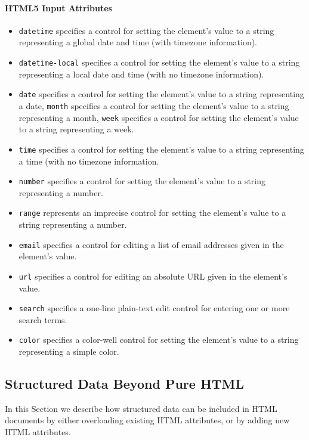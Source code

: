 \documentclass[12pt]{article}
\begin{document}
\paragraph{HTML5 Input Attributes}
\begin{itemize}
\item \texttt{datetime} specifies a control for setting the element's value to a string representing a global date and time (with timezone information).
\item \texttt{datetime-local} specifies a control for setting the element's value to a string representing a local date and time (with no timezone information).
\item \texttt{date} specifies a control for setting the element's value to a string representing a date, \texttt{month} specifies a control for setting the element's value to a string representing a month, \texttt{week} specifies a control for setting the element's value to a string representing a week.
\item \texttt{time} specifies a control for setting the element's value to a string representing a time (with no timezone information.
\item \texttt{number} specifies a control for setting the element's value to a string representing a number.
\item \texttt{range}  represents an imprecise control for setting the element's value to a string representing a number.
\item \texttt{email} specifies a control for editing a list of email addresses given in the element's value.
\item \texttt{url} specifies a control for editing an absolute URL given in the element's value.
\item \texttt{search} specifies a one-line plain-text edit control for entering one or more search terms.
\item \texttt{color} specifies a color-well control for setting the element's value to a string representing a simple color.
\end{itemize}

\subsection{Structured Data Beyond Pure HTML}
In this Section we describe how structured data can be included in HTML documents by either overloading existing HTML attributes, or by adding new HTML attributes.
\end{document}

